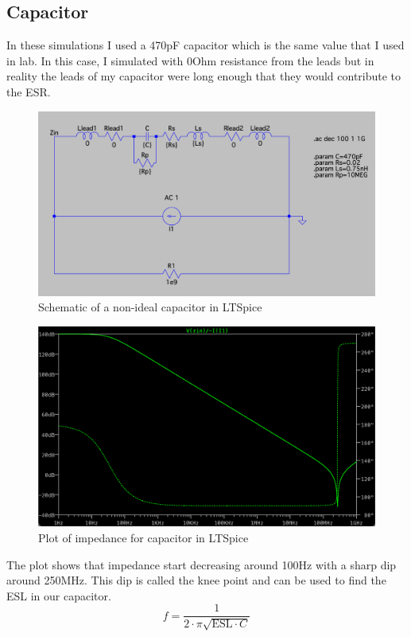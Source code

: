\documentclass[12pt]{article}
\begin{document}
\subsection*{Capacitor}
In these simulations I used a 470pF capacitor which is the same value that I used in lab. In this case, I simulated with 0Ohm resistance from the leads but in reality the leads of my capacitor were long enough that they would contribute to the ESR. 
\begin{figure}[h]
\centering
\includegraphics[width=12cm]{assets/cap_schematic.png}
\caption{Schematic of a non-ideal capacitor in LTSpice}
\end{figure}
\begin{figure}[h]
\centering
\includegraphics[width=12cm]{assets/cap_impedance.png}
\caption{Plot of impedance for capacitor in LTSpice}
\end{figure}
The plot shows that impedance start decreasing around 100Hz with a sharp dip around 250MHz. This dip is called the knee point and can be used to find the ESL in our capacitor. 
\begin{equation} 
     f = \frac{1}{2\cdot\pi\sqrt{\text{ESL}\cdot C}}
\end{equation}
\end{document}
